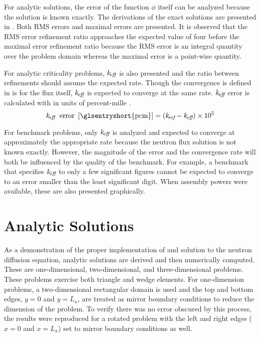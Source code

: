   For analytic solutions, the error of the function $\phi$ itself can be 
  analyzed because the solution is known exactly. The derivations of the exact 
  solutions are presented in . Both RMS errors and
  maximal errors are presented. It is observed that the RMS error refinement
  ratio approaches the expected value of four before the maximal error
  refinement ratio because the RMS error is an integral quantity over the
  problem domain whereas the maximal error is a point-wise quantity.

  For analytic criticality  problems, $k_{\!\mbox{\scriptsize \em eff}}$ is also presented and the ratio
  between refinements should assume the expected rate. Though the convergence is
  defined in  is for the flux itself, $k_{\!\mbox{\scriptsize \em eff}}$ is expected
  to  converge at the same rate.  $k_{\!\mbox{\scriptsize \em eff}}$ error is calculated with
   in units of percent-mille .
  \begin{equation}
    \label{eq:keff_err}
    \keff \; \text{ error } \units{\glsentryshort{pcm}} = (\kref - \keff) \times 10^5
  \end{equation}

  For benchmark problems, only $k_{\!\mbox{\scriptsize \em eff}}$ is analyzed and expected to converge
  at approximately the appropriate rate because the neutron flux solution is not 
  known exactly. However, the magnitude of the error and the convergence rate
  will both be influenced by the quality of the benchmark. For example, a
  benchmark that specifies $k_{\!\mbox{\scriptsize \em eff}}$ to only a few significant figures cannot be 
  expected to converge to an error smaller than the least significant digit. 
  When assembly powers were available, these are also presented graphically. 
  \def\Put(#1,#2)#3{\leavevmode\makebox(0,0){\put(#1,#2){#3}}}

\section{Analytic Solutions}
  As a demonstration of the proper implementation of and solution to the 
  neutron diffusion equation, analytic solutions are derived and then 
  numerically computed. These are one-dimensional, two-dimensional, and 
  three-dimensional problems. These problems exercise both triangle and wedge 
  elements. For one-dimension problems, a two-dimensional rectangular domain is
  used and the top and bottom edges, $y=0$ and $y=L_x$, are treated as mirror 
  boundary conditions to reduce the dimension of the problem. To verify there
  was no error obscured by this process, the results were reproduced for a 
  rotated problem with the left and right edges ($x=0$ and $x=L_x$) set to
  mirror boundary conditions as well.

